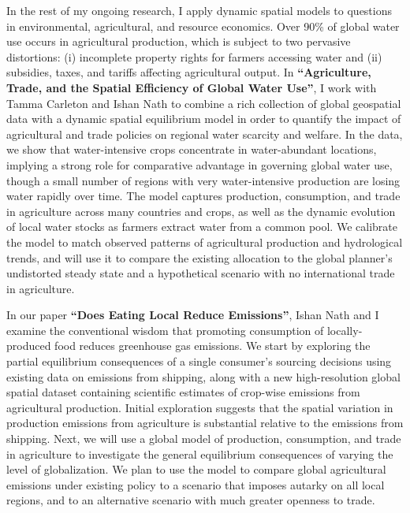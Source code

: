 \documentclass{jmstatement}
\begin{document}

In the rest of my ongoing research, I apply dynamic spatial models to questions
in environmental, agricultural, and resource economics.
Over 90\% of global water use occurs in agricultural production,
which is subject to two pervasive distortions: (i) incomplete property
rights for farmers accessing water and (ii) subsidies, taxes, and
tariffs affecting agricultural output.
In \textbf{``Agriculture, Trade, and the Spatial Efficiency of Global Water Use''},
I work with Tamma Carleton and Ishan Nath to combine a rich
collection of global geospatial data with a dynamic spatial equilibrium
model in order to quantify the impact of agricultural and trade policies on
regional water scarcity and welfare. In the data, we show that
water-intensive crops concentrate in water-abundant locations,
implying a strong role for comparative advantage in governing global
water use, though a small number of regions with very water-intensive
production are losing water rapidly over time. The model captures
production, consumption, and trade in agriculture across many countries
and crops, as well as the dynamic evolution of local water stocks as
farmers extract water from a common pool. We calibrate the model to
match observed patterns of agricultural production and hydrological
trends, and will use it to compare the existing allocation to the global
planner's undistorted steady state and a hypothetical scenario with no
international trade in agriculture.

In our paper \textbf{``Does Eating Local Reduce Emissions''}, Ishan Nath and I
examine the conventional wisdom that promoting
consumption of locally-produced food reduces greenhouse gas emissions.
We start by exploring the partial equilibrium consequences of a single
consumer's sourcing decisions using existing data on emissions from
shipping, along with a new high-resolution global spatial dataset
containing scientific estimates of crop-wise emissions from agricultural
production. Initial exploration suggests that the spatial variation in
production emissions from agriculture is substantial relative to the
emissions from shipping. Next, we will use a global model of production,
consumption, and trade in agriculture to investigate the general
equilibrium consequences of varying the level of globalization. We plan
to use the model to compare global agricultural emissions under existing
policy to a scenario that imposes autarky on all local regions, and to
an alternative scenario with much greater openness to trade.
\end{document}
